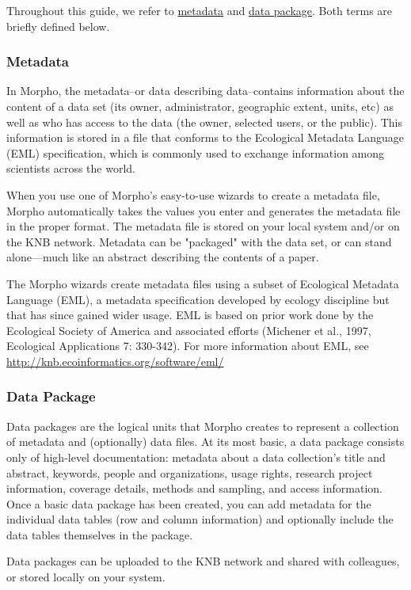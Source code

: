 Throughout this guide, we refer to \hyperref[sec:metadata]{metadata}
and \hyperref[sec:data package]{data package}. Both terms are briefly
defined below.

\subsubsection{Metadata} \label{sec:metadata}

In Morpho, the metadata--or data describing data--contains information
about the content of a data set (its owner, administrator, geographic
extent, units, etc) as well as who has access to the data (the owner,
selected users, or the public). This information is stored in a file
that conforms to the Ecological Metadata Language (EML) specification,
which is commonly used to exchange information among scientists across
the world.

When you use one of Morpho's easy-to-use wizards to create a metadata
file, Morpho automatically takes the values you enter and generates the
metadata file in the proper format. The metadata file is stored on your
local system and/or on the KNB network. Metadata can be "packaged" with
the data set, or can stand alone—much like an abstract describing the
contents of a paper. 

The Morpho wizards create metadata files using a subset of Ecological
Metadata Language (EML), a metadata specification developed by ecology
discipline but that has since gained wider usage. EML is based on prior
work done by the Ecological Society of America and associated efforts
(Michener et al., 1997, Ecological Applications 7: 330-342). For more
information about EML, see
\url{http://knb.ecoinformatics.org/software/eml/}


\subsubsection{Data Package} \label{sec:data package}

Data packages are the logical units that Morpho creates to represent a
collection of metadata and (optionally) data files. At its most basic, a
data package consists only of high-level documentation: metadata about a
data collection's title and abstract, keywords, people and
organizations, usage rights, research project information, coverage
details, methods and sampling, and access information. Once a basic data
package has been created, you can add metadata for the individual data
tables (row and column information) and optionally include the data
tables themselves in the package. 

Data packages can be uploaded to the KNB network and shared with
colleagues, or stored locally on your system.

